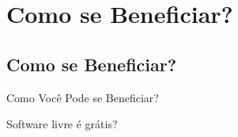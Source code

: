 \documentclass[xcolor=dvipsnames]{beamer}
\begin{document}



\section{Como se Beneficiar?}	
\subsection{Como se Beneficiar?}	

\begin{frame}
\vspace{0.2cm}
\begin{center}
\Huge{Como Você Pode se Beneficiar?}
\end{center}
\end{frame}


\begin{frame}
	\LARGE{Software livre é grátis}\pause\LARGE{?}
\end{frame}
\end{document}
